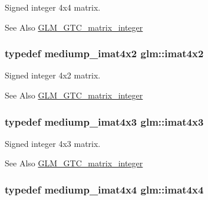 Signed integer 4x4 matrix. \begin{DoxySeeAlso}{See Also}
\hyperlink{group__gtc__matrix__integer}{G\-L\-M\-\_\-\-G\-T\-C\-\_\-matrix\-\_\-integer} 
\end{DoxySeeAlso}
\hypertarget{group__gtc__matrix__integer_ga7e733984837e0e7aa9f4aac18f632f63}{
\subsubsection[{imat4x2}]{\setlength{\rightskip}{0pt plus 5cm}typedef mediump\-\_\-imat4x2 {\bf glm\-::imat4x2}}}\label{group__gtc__matrix__integer_ga7e733984837e0e7aa9f4aac18f632f63}
Signed integer 4x2 matrix. \begin{DoxySeeAlso}{See Also}
\hyperlink{group__gtc__matrix__integer}{G\-L\-M\-\_\-\-G\-T\-C\-\_\-matrix\-\_\-integer} 
\end{DoxySeeAlso}
\hypertarget{group__gtc__matrix__integer_gaa4cca8e80c0603239eda452860063844}{
\subsubsection[{imat4x3}]{\setlength{\rightskip}{0pt plus 5cm}typedef mediump\-\_\-imat4x3 {\bf glm\-::imat4x3}}}\label{group__gtc__matrix__integer_gaa4cca8e80c0603239eda452860063844}
Signed integer 4x3 matrix. \begin{DoxySeeAlso}{See Also}
\hyperlink{group__gtc__matrix__integer}{G\-L\-M\-\_\-\-G\-T\-C\-\_\-matrix\-\_\-integer} 
\end{DoxySeeAlso}
\hypertarget{group__gtc__matrix__integer_ga367d8d5281ff82f1215a227dd2ea5ba9}{
\subsubsection[{imat4x4}]{\setlength{\rightskip}{0pt plus 5cm}typedef mediump\-\_\-imat4x4 {\bf glm\-::imat4x4}}}\label{group__gtc__matrix__integer_ga367d8d5281ff82f1215a227dd2ea5ba9}
